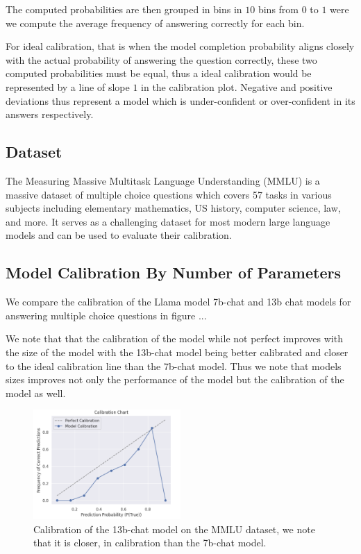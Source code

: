 \documentclass[11pt]{article}
\begin{document}
The computed probabilities are then grouped in bins in $10$ bins from 
$0$ to $1$ were we compute the average frequency of answering 
correctly for each bin. 

For ideal calibration, that is when the model completion probability aligns
closely with the actual probability of answering the question correctly, these 
two computed probabilities must be equal, thus a ideal calibration would be 
represented  by a line of slope $1$ in the calibration plot. Negative 
and positive deviations thus represent a model which is under-confident 
or over-confident  in its answers respectively.

\subsection{Dataset}

The Measuring Massive Multitask Language Understanding (MMLU) 
\cite{hendrycks2021measuring} is a massive dataset of multiple choice 
questions which covers 57 tasks in various subjects including 
elementary mathematics, US history, computer science, law, and more. It 
serves as a challenging dataset for most modern large language models and can be used to evaluate their calibration.

\subsection{Model Calibration By Number of Parameters}

We compare the calibration of the Llama \cite{touvron2023llama} model 
7b-chat and 13b chat models for answering multiple choice questions in 
figure ... 

We note that that the calibration of the model while not perfect improves 
with the size of the model with the 13b-chat model being better calibrated 
and closer to the ideal calibration line than the 7b-chat model. Thus we 
note that models sizes improves not only the performance of the model but
the calibration of the model as well.

\begin{figure}
  \centering
  \includegraphics[width=0.5\textwidth]{figures/mmlu-13b-chat.png}
  \caption{Calibration of the 13b-chat model on the MMLU dataset, we 
  note that it is closer, in calibration than the 7b-chat model.}
\end{figure}
\end{document}
